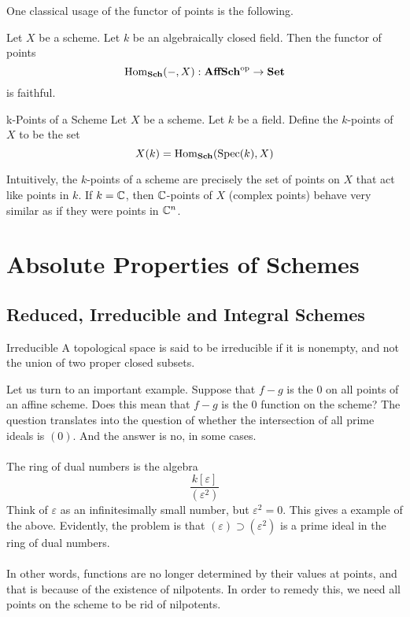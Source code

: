 \documentclass[a4paper]{article}
\begin{document}
One classical usage of the functor of points is the following. 

\begin{lmm}{}{} Let $X$ be a scheme. Let $k$ be an algebraically closed field. Then the functor of points $$\operatorname{Hom}_\bold{Sch}(-,X):\bold{AffSch}^\text{op}\to\bold{Set}$$ is faithful. 
\end{lmm}

\begin{defn}{k-Points of a Scheme}{} Let $X$ be a scheme. Let $k$ be a field. Define the $k$-points of $X$ to be the set $$X(k)=\operatorname{Hom}_\bold{Sch}(\text{Spec}(k),X)$$
\end{defn}

Intuitively, the $k$-points of a scheme are precisely the set of points on $X$ that act like points in $k$. If $k=\mathbb{C}$, then $\mathbb{C}$-points of $X$ (complex points) behave very similar as if they were points in $\mathbb{C}^n$. 

\pagebreak
\section{Absolute Properties of Schemes}
\subsection{Reduced, Irreducible and Integral Schemes}
\begin{defn}{Irreducible}{} A topological space is said to be irreducible if it is nonempty, and not the union of two proper closed subsets. 
\end{defn}

Let us turn to an important example. Suppose that $f-g$ is the $0$ on all points of an affine scheme. Does this mean that $f-g$ is the $0$ function on the scheme? The question translates into the question of whether the intersection of all prime ideals is $(0)$. And the answer is no, in some cases. \\~\\

The ring of dual numbers is the algebra $$\frac{k[\varepsilon]}{(\varepsilon^2)}$$ Think of $\varepsilon$ as an infinitesimally small number, but $\varepsilon^2=0$. This gives a example of the above. Evidently, the problem is that $(\varepsilon)\supset(\varepsilon^2)$ is a prime ideal in the ring of dual numbers. \\~\\

In other words, functions are no longer determined by their values at points, and that is because of the existence of nilpotents. In order to remedy this, we need all points on the scheme to be rid of nilpotents. 
\end{document}

